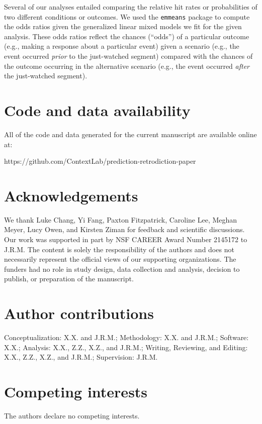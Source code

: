 \documentclass[10pt]{article}
\begin{document}
Several of our analyses entailed comparing the relative hit rates or
probabilities of two different conditions or outcomes. We used the
\texttt{emmeans} package to compute the odds ratios given the generalized
linear mixed models we fit for the given analysis. These odds ratios reflect
the chances (``odds'') of a particular outcome (e.g., making a response about a
particular event) given a scenario (e.g., the event occurred \textit{prior} to
the just-watched segment) compared with the chances of the outcome occurring in
the alternative scenario (e.g., the event occurred \textit{after} the
just-watched segment).

\section*{Code and data availability}

All of the code and data generated for the current manuscript are available
online at:

https://github.com/ContextLab/prediction-retrodiction-paper

% 


\section*{Acknowledgements}

We thank Luke Chang, Yi Fang, Paxton Fitzpatrick, Caroline Lee, Meghan Meyer,
Lucy Owen, and Kirsten Ziman for feedback and scientific discussions. Our work
was supported in part by NSF CAREER Award Number 2145172 to J.R.M. The content
is solely the responsibility of the authors and does not necessarily represent
the official views of our supporting organizations. The funders had no role in
study design, data collection and analysis, decision to publish, or preparation
of the manuscript.

\section*{Author contributions}

Conceptualization: X.X. and J.R.M.; Methodology: X.X. and J.R.M.; Software:
X.X.; Analysis: X.X., Z.Z., X.Z., and J.R.M.; Writing, Reviewing, and Editing:
X.X., Z.Z., X.Z., and J.R.M.; Supervision: J.R.M.

\section*{Competing interests}

The authors declare no competing interests.
\end{document}
